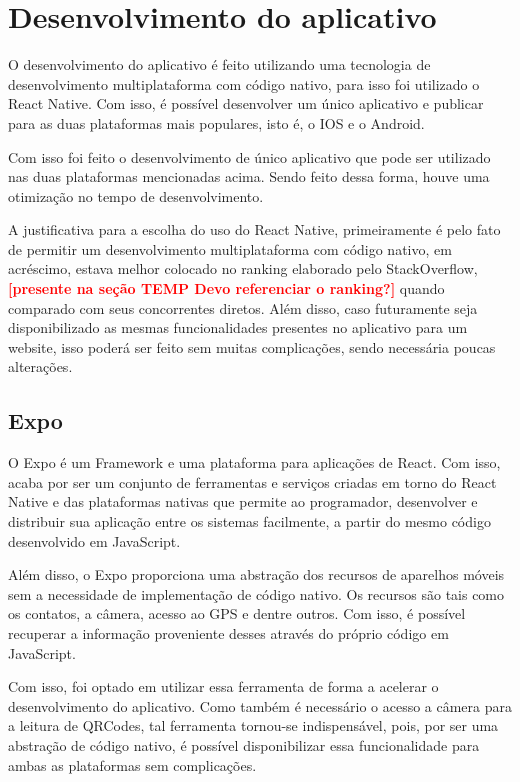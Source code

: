 \section{Desenvolvimento do aplicativo}\label{desenvApp}

O desenvolvimento do aplicativo é feito utilizando uma tecnologia de desenvolvimento multiplataforma com código nativo, para isso foi utilizado o React Native. Com isso, é possível desenvolver um único aplicativo e publicar para as duas plataformas mais populares, isto é, o IOS e o Android.

Com isso foi feito o desenvolvimento de único aplicativo que pode ser utilizado nas duas plataformas mencionadas acima. Sendo feito dessa forma, houve uma otimização no tempo de desenvolvimento.

A justificativa para a escolha do uso do React Native, primeiramente é pelo fato de permitir um desenvolvimento multiplataforma com código nativo, em acréscimo, estava melhor colocado no ranking elaborado pelo StackOverflow, \textcolor{red}{\textbf{[presente na seção {TEMP} Devo referenciar o ranking?]}} quando comparado com seus concorrentes diretos. Além disso, caso futuramente seja disponibilizado as mesmas funcionalidades presentes no aplicativo para um website, isso poderá ser feito sem muitas complicações, sendo necessária poucas alterações.

\subsection{Expo}

O Expo é um Framework e uma plataforma para aplicações de React. Com isso, acaba por ser um conjunto de ferramentas e serviços criadas em torno do React Native e das plataformas nativas que permite ao programador, desenvolver e distribuir sua aplicação entre os sistemas facilmente, a partir do mesmo código desenvolvido em JavaScript.

Além disso, o Expo proporciona uma abstração dos recursos de aparelhos móveis sem a necessidade de implementação de código nativo. Os recursos são tais como os contatos, a câmera, acesso ao GPS e dentre outros. Com isso, é possível recuperar a informação proveniente desses através do próprio código em JavaScript.

Com isso, foi optado em utilizar essa ferramenta de forma a acelerar o desenvolvimento do aplicativo. Como também é necessário o acesso a câmera para a leitura de QRCodes, tal ferramenta tornou-se indispensável, pois, por ser uma abstração de código nativo, é possível disponibilizar essa funcionalidade para ambas as plataformas sem complicações.

